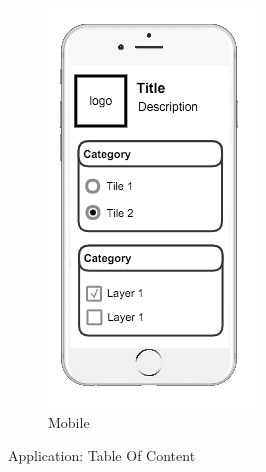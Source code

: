 \begin{figure}[ht]
\begin{subfigure}[b]{0.2\textwidth}
    \includegraphics[width=\textwidth]
      {img/c02-application/png/mobile-basemap-toc.png}
    \caption{Mobile}
  \end{subfigure}
  \caption{Application: Table Of Content}
\end{figure}



